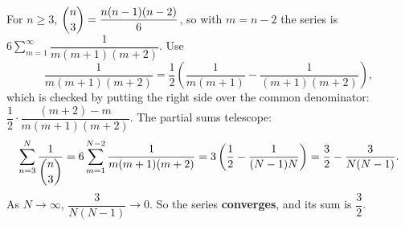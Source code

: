 For $n\ge3$, $\dbinom n3=\dfrac{n(n-1)(n-2)}{6}$, so with $m=n-2$ the series is $\displaystyle6\sum_{m=1}^{\infty}\dfrac{1}{m(m+1)(m+2)}$. Use
\[\dfrac{1}{m(m+1)(m+2)}=\dfrac{1}{2}\left(\dfrac{1}{m(m+1)}-\dfrac{1}{(m+1)(m+2)}\right),\]
which is checked by putting the right side over the common denominator: $\dfrac{1}{2}\cdot\dfrac{(m+2)-m}{m(m+1)(m+2)}$. The partial sums telescope:
\[\sum_{n=3}^{N}\dfrac{1}{\dbinom n3}=6\sum_{m=1}^{N-2}\dfrac{1}{m(m+1)(m+2)}=3\left(\dfrac{1}{2}-\dfrac{1}{(N-1)N}\right)=\dfrac{3}{2}-\dfrac{3}{N(N-1)}.\]
As $N\to\infty$, $\dfrac{3}{N(N-1)}\to0$. So the series \textbf{converges}, and its sum is $\boxed{\dfrac{3}{2}}$.
